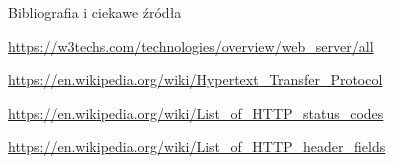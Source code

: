 \begin{frame}{Bibliografia i ciekawe źródła}
  
	\begin{thebibliography}{9}
	
		\url{https://w3techs.com/technologies/overview/web_server/all}
		
		\url{https://en.wikipedia.org/wiki/Hypertext_Transfer_Protocol}
		
		\url{https://en.wikipedia.org/wiki/List_of_HTTP_status_codes}
		
		\url{https://en.wikipedia.org/wiki/List_of_HTTP_header_fields}
	
	\end{thebibliography}

\end{frame}

